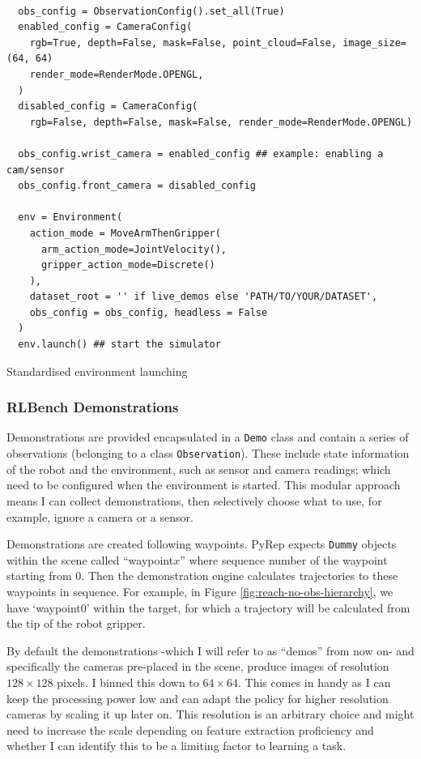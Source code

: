 \begin{listing}[H]
  \begin{verbatim}

  obs_config = ObservationConfig().set_all(True) 
  enabled_config = CameraConfig(
    rgb=True, depth=False, mask=False, point_cloud=False, image_size=(64, 64)
    render_mode=RenderMode.OPENGL,
  )
  disabled_config = CameraConfig(
    rgb=False, depth=False, mask=False, render_mode=RenderMode.OPENGL)

  obs_config.wrist_camera = enabled_config ## example: enabling a cam/sensor
  obs_config.front_camera = disabled_config

  env = Environment(
    action_mode = MoveArmThenGripper(
      arm_action_mode=JointVelocity(), 
      gripper_action_mode=Discrete()
    ),
    dataset_root = '' if live_demos else 'PATH/TO/YOUR/DATASET',
    obs_config = obs_config, headless = False
  )
  env.launch() ## start the simulator
  \end{verbatim}
  \caption{Standardised environment launching}\label{lst:env-setup}
\end{listing}

\subsubsection{RLBench Demonstrations}
Demonstrations are provided encapsulated in a \verb|Demo| class and contain a series of observations (belonging to a class \verb|Observation|). These include state information of the robot and the environment, such as sensor and camera readings; which need to be configured when the environment is started. This modular approach means I can collect demonstrations, then selectively choose what to use, for example, ignore a camera or a sensor. \par 
Demonstrations are created following waypoints. PyRep expects  \verb|Dummy| objects within the scene called ``waypoint$x$'' where sequence number of the waypoint starting from $0$. Then the demonstration engine calculates trajectories to these waypoints in sequence. For example, in Figure \ref{fig:reach-no-obs-hierarchy}, we have `waypoint0' within the target, for which a trajectory will be calculated from the tip of the robot gripper.

By default the demonstrations -which I will refer to as ``demos'' from now on- and specifically the cameras pre-placed in the scene, produce images of resolution $128 \times 128$ pixels. I binned this down to $64 \times 64$. This comes in handy as I can keep the processing power low and can adapt the policy for higher resolution cameras by scaling it up later on. This resolution is an arbitrary choice and might need to increase the scale depending on feature extraction proficiency and whether I can identify this to be a limiting factor to learning a task.

